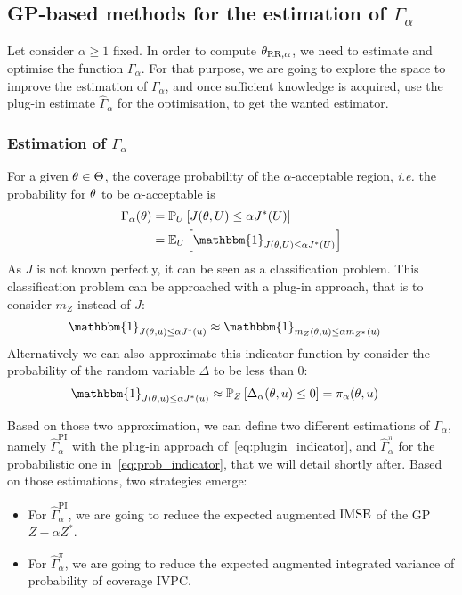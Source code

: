 \documentclass[../../Main_ManuscritThese.tex]{subfiles}
\begin{document}
\subsection{GP-based methods for the estimation of $\Gamma_{\alpha}$}
\label{sec:evaluation_gamma}
Let consider $\alpha\geq 1$ fixed. In order to compute
${\theta}_{\mathrm{RR, \alpha}}$, we need to estimate and optimise the
function $\Gamma_{\alpha}$. For that purpose, we are going to explore
the space to improve the estimation of $\Gamma_{\alpha}$, and once
sufficient knowledge is acquired, use the plug-in %
estimate $\hat{\Gamma}_{\alpha}$ for the optimisation, to get the
wanted estimator.

\subsubsection{Estimation of $\Gamma_{\alpha}$}

For a given $\theta\in\Theta$, the coverage probability of the
$\alpha$-acceptable region, \emph{i.e.} the probability for $\theta$ to be
$\alpha$-acceptable is
\begin{align}
  \Gamma_{\alpha}(\kk)  & = \Prob_{U}\left[J(\kk,\UU) \leq \alpha J^*(\UU)\right] \\
                      & =\Ex_{U}\left[\mathbbm{1}_{J(\kk,\UU) \leq \alpha J^*(\UU)}\right]
\end{align}
As $J$ is not known perfectly, it can be seen as a classification
problem.  This classification problem can be approached with a plug-in
approach, that is to consider $m_Z$ instead of $J$:
\begin{align}
  \mathbbm{1}_{J(\kk,\uu) \leq \alpha J^*(\uu)} & \approx   \mathbbm{1}_{m_Z(\kk,\uu) \leq \alpha m_{{Z^*}}(\uu)} \label{eq:plugin_indicator}
\end{align}
Alternatively we can also approximate this indicator function by
consider the probability of the random variable $\Delta$ to be less
than $0$:
\begin{align}
  \mathbbm{1}_{J(\kk,\uu) \leq \alpha J^*(\uu)} & \approx   \Prob_{Z}\left[ \Delta_{\alpha}(\kk,\uu) \leq 0 \right] = \pi_{\alpha}(\kk,\uu) \label{eq:prob_indicator}
\end{align}

Based on those two approximation, we can define two different
estimations of $\Gamma_\alpha$, namely
$\hat{\Gamma}_\alpha^{\mathrm{PI}}$ with the plug-in approach
of~\cref{eq:plugin_indicator}, and $\hat{\Gamma}_{\alpha}^{\pi}$ for
the probabilistic one in~\cref{eq:prob_indicator}, that we will detail
shortly after. Based on those estimations, two strategies emerge:
\begin{itemize}
\item For $\hat{\Gamma}_{\alpha}^{\mathrm{PI}}$, we are going to
  reduce the expected augmented $\operatorname{\mathrm{IMSE}}$ of the GP $Z - \alpha Z^*$.
\item For $\hat{\Gamma}_{\alpha}^{\pi}$, we are going to reduce the
  expected augmented integrated variance of probability of coverage
  $\mathrm{IVPC}$.
\end{itemize}
\end{document}
